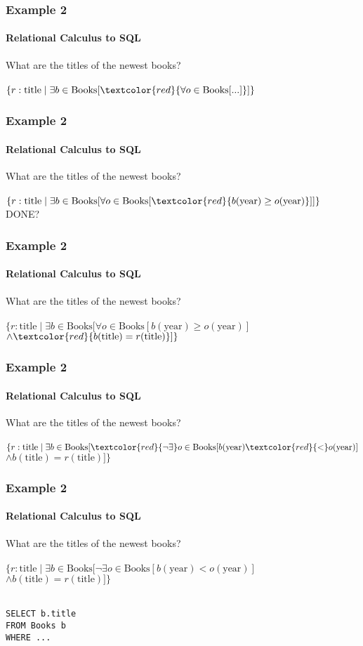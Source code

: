 \documentclass{beamer}
\begin{document}
\begin{frame}
  \frametitle{Example 2}
    \framesubtitle{Relational Calculus to SQL}
  What are the titles of the newest books?\\
  \hfill \\
  $\{r:\text{title} \mid \exists b \in \text{Books} [ \textcolor{red}{\forall o \in \text{Books} [...]} ] \}$
\end{frame}

\begin{frame}
  \frametitle{Example 2}
    \framesubtitle{Relational Calculus to SQL}
  What are the titles of the newest books?\\
  \hfill \\
  $\{r:\text{title} \mid \exists b \in \text{Books} [ \forall o \in \text{Books} [ \textcolor{red}{b(\text{year}) \geq o(\text{year})}]] \}$\\
  DONE?
\end{frame}

\begin{frame}
  \frametitle{Example 2}
    \framesubtitle{Relational Calculus to SQL}
  What are the titles of the newest books?\\
  \hfill \\
  $\{r:\text{title} \mid \exists b \in \text{Books} [ \forall o \in \text{Books} [ b(\text{year}) \geq o(\text{year})]$\\
  $\land \textcolor{red}{b(\text{title}) = r(\text{title})}] \}$
\end{frame}

\begin{frame}
  \frametitle{Example 2}
    \framesubtitle{Relational Calculus to SQL}
  What are the titles of the newest books?\\
  \hfill \\
  $\{r:\text{title} \mid \exists b \in \text{Books} [ \textcolor{red}{\neg\exists} o \in \text{Books} [ b(\text{year}) \textcolor{red}{<} o(\text{year})]$\\
  $\land b(\text{title}) = r(\text{title})] \}$
\end{frame}

\begin{frame}[fragile]
  \frametitle{Example 2}
    \framesubtitle{Relational Calculus to SQL}
  What are the titles of the newest books?\\
  \hfill \\
  $\{r:\text{title} \mid \exists b \in \text{Books} [ \neg\exists o \in \text{Books} [ b(\text{year}) < o(\text{year})]$\\
  $\land b(\text{title}) = r(\text{title})] \}$\\
  \hfill \\
\begin{lstlisting}
SELECT b.title
FROM Books b
WHERE ...
\end{lstlisting}
\end{frame}
\end{document}
